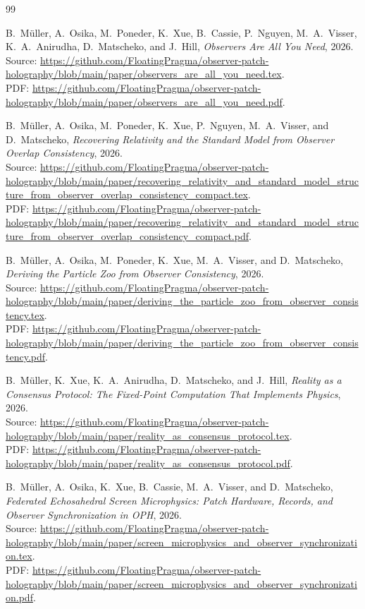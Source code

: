 \documentclass[11pt]{article}
\numberwithin{equation}{section}
\theoremstyle{remark}
\begin{document}
\begin{thebibliography}{99}

B.~M\"uller, A.~Osika, M.~Poneder, K.~Xue, B.~Cassie, P.~Nguyen, M.~A.~Visser, K.~A.~Anirudha, D.~Matscheko, and J.~Hill,
\emph{Observers Are All You Need},
2026.\\
Source: \url{https://github.com/FloatingPragma/observer-patch-holography/blob/main/paper/observers_are_all_you_need.tex}.\\
PDF: \url{https://github.com/FloatingPragma/observer-patch-holography/blob/main/paper/observers_are_all_you_need.pdf}.

B.~M\"uller, A.~Osika, M.~Poneder, K.~Xue, P.~Nguyen, M.~A.~Visser, and D.~Matscheko,
\emph{Recovering Relativity and the Standard Model from Observer Overlap Consistency},
2026.\\
Source: \url{https://github.com/FloatingPragma/observer-patch-holography/blob/main/paper/recovering_relativity_and_standard_model_structure_from_observer_overlap_consistency_compact.tex}.\\
PDF: \url{https://github.com/FloatingPragma/observer-patch-holography/blob/main/paper/recovering_relativity_and_standard_model_structure_from_observer_overlap_consistency_compact.pdf}.

B.~M\"uller, A.~Osika, M.~Poneder, K.~Xue, M.~A.~Visser, and D.~Matscheko,
\emph{Deriving the Particle Zoo from Observer Consistency},
2026.\\
Source: \url{https://github.com/FloatingPragma/observer-patch-holography/blob/main/paper/deriving_the_particle_zoo_from_observer_consistency.tex}.\\
PDF: \url{https://github.com/FloatingPragma/observer-patch-holography/blob/main/paper/deriving_the_particle_zoo_from_observer_consistency.pdf}.

B.~M\"uller, K.~Xue, K.~A.~Anirudha, D.~Matscheko, and J.~Hill,
\emph{Reality as a Consensus Protocol: The Fixed-Point Computation That Implements Physics},
2026.\\
Source: \url{https://github.com/FloatingPragma/observer-patch-holography/blob/main/paper/reality_as_consensus_protocol.tex}.\\
PDF: \url{https://github.com/FloatingPragma/observer-patch-holography/blob/main/paper/reality_as_consensus_protocol.pdf}.

B.~M\"uller, A.~Osika, K.~Xue, B.~Cassie, M.~A.~Visser, and D.~Matscheko,
\emph{Federated Echosahedral Screen Microphysics: Patch Hardware, Records, and Observer Synchronization in OPH},
2026.\\
Source: \url{https://github.com/FloatingPragma/observer-patch-holography/blob/main/paper/screen_microphysics_and_observer_synchronization.tex}.\\
PDF: \url{https://github.com/FloatingPragma/observer-patch-holography/blob/main/paper/screen_microphysics_and_observer_synchronization.pdf}.


\end{thebibliography}
\end{document}
